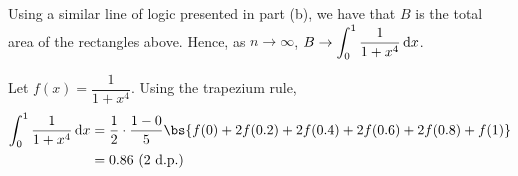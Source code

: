\documentclass{echw}
\begin{document}
            Using a similar line of logic presented in part (b), we have that $B$ is the total area of the rectangles above. Hence, as $n \to \infty$, $B \to \displaystyle\int_{0}^1 \dfrac1{1 + x^4} \mathop{\mathrm{d}x}$. 
            
            Let $f(x) = \dfrac1{1 + x^4}$. Using the trapezium rule,
            \begin{align*}
                \int_0^1 \dfrac1{1 + x^4} \d x &= \dfrac12 \cdot \dfrac{1-0}{5} \bs{f(0) + 2f(0.2) + 2f(0.4) + 2f(0.6) + 2f(0.8) + f(1)}\\
                &= 0.86 \todp{2}
            \end{align*}
            
\end{document}

